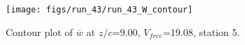\begin{figure}[H]
\centering
\texttt{[image: figs/run\_43/run\_43\_W\_contour]}
\caption{Contour plot of $\overline{w}$ at $z/c$=9.00, $V_{free}$=19.08, station 5.}
\label{fig:run_43_W_contour}
\end{figure}


